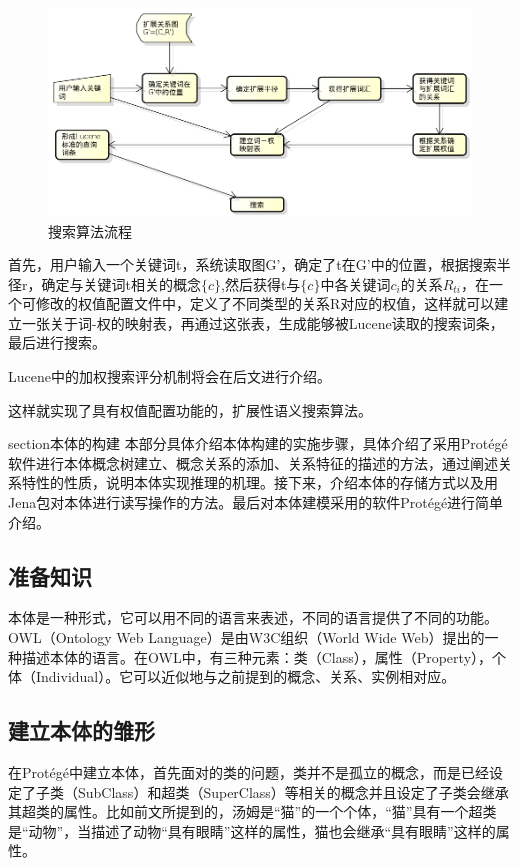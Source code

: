 \documentclass[12pt,a4paper]{article}
\begin{document}
	\begin{figure}[htbp] 
	\centering\includegraphics[width=5in]{fig/searchFlow.png} 
	\caption{搜索算法流程}\label{fig:搜索算法流程} 
	\end{figure} 
	
	首先，用户输入一个关键词t，系统读取图G'，确定了t在G'中的位置，根据搜索半径r，确定与关键词t相关的概念$\{c\}$,然后获得t与$\{c\}$中各关键词$c_{i}$的关系$R_{ti}$，在一个可修改的权值配置文件中，定义了不同类型的关系R对应的权值，这样就可以建立一张关于词-权的映射表，再通过这张表，生成能够被Lucene读取的搜索词条，最后进行搜索。
	
	Lucene中的加权搜索评分机制将会在后文进行介绍。
		
	这样就实现了具有权值配置功能的，扩展性语义搜索算法。

section{本体的构建}
	本部分具体介绍本体构建的实施步骤，具体介绍了采用Prot{\'e}g{\'e}软件进行本体概念树建立、概念关系的添加、关系特征的描述的方法，通过阐述关系特性的性质，说明本体实现推理的机理。接下来，介绍本体的存储方式以及用Jena包对本体进行读写操作的方法。最后对本体建模采用的软件Prot{\'e}g{\'e}进行简单介绍。

	\subsection{准备知识}
	本体是一种形式，它可以用不同的语言来表述，不同的语言提供了不同的功能。OWL（Ontology Web Language）是由W3C组织（World Wide Web）提出的一种描述本体的语言。在OWL中，有三种元素：类（Class），属性（Property），个体（Individual）。它可以近似地与之前提到的概念、关系、实例相对应。
		
	\subsection{建立本体的雏形}
	
	在Prot{\'e}g{\'e}中建立本体，首先面对的类的问题，类并不是孤立的概念，而是已经设定了子类（SubClass）和超类（SuperClass）等相关的概念并且设定了子类会继承其超类的属性。比如前文所提到的，汤姆是“猫”的一个个体，“猫”具有一个超类是“动物”，当描述了动物“具有眼睛”这样的属性，猫也会继承“具有眼睛”这样的属性。
	
\end{document}
